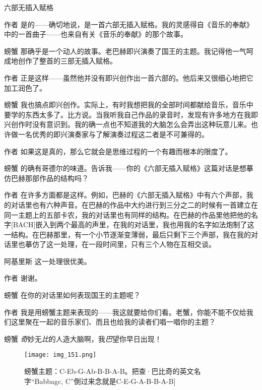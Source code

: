 \begin{dialog}{六部无插入赋格}
\begin{dialogue}
\item[作者]是的——确切地说，是一首六部无插入赋格。我的灵感得自《音乐的奉献》中的一首曲子——也来自有关《音乐的奉献》的那个故事。

\item[螃蟹]那确乎是一个动人的故事。老巴赫即兴演奏了国王的主题。我记得他一气呵成地创作了整首的三部无插入赋格。

\item[作者]正是这样——虽然他并没有即兴创作出一首六部的。他后来又很细心地把它加工润色了。

\item[螃蟹]我也搞点即兴创作。实际上，有时我想把我的全部时间都献给音乐，音乐中要学的东西太多了。比方说。当我听我自己作品的录音时，发现有许多地方在我即兴创作时没有意识到。我的确一点也不知道我的大脑怎么会弄出这种玩意儿来。也许做一名优秀的即兴演奏家与了解演奏过程这二者是不可兼得的。

\item[作者]如果这是真的，那么它就会是思维过程的一个有趣而根本的限度了。

\item[螃蟹]的确有哥德尔的味道。告诉我——你的《六部无插入赋格》这篇对话是想摹仿巴赫那部作品的结构吗？

\item[作者]在许多方面都是这样。例如，巴赫的《六部无插入赋格》中有六个声部，我的对话里也有六种声音。在巴赫的作品中大约进行到三分之二的时候有一首建立在同一主题上的五部卡农，我的对话里也有同样的结构。在巴赫的作品里他把他的名字[BACH]嵌入到两个最高的声里，在我的对话里，我也用我的名字如法炮制了这一结构。在巴赫那里，有一个小节逐渐变薄弱，最后只剩下三个声部，我在我的对话里也摹仿了这一处理，在一段时间里，只有三个人物在互相交谈。

\item[阿基里斯]这一处理很优美。

\item[作者]谢谢。

\item[螃蟹]在你的对话里如何表现国王的主题呢？

\item[作者]我是用螃蟹主题来表现的——我这就要给你们看。老蟹，你能不能不仅给我们这里聚在一起的音乐家们、而且也给我的读者们唱一唱你的主题？

\item[螃蟹]\emph{奇}妙无\emph{比}的人造大脑啊，我\emph{巴}望你早日出现！

\begin{figure}
\texttt{[image: img\_151.png]}
\caption[螃蟹主题。]
  {螃蟹主题：C-Eb-G-Ab-B-B-A-B。把查·巴比奇的英文名字“Babbagc, C”倒过来念就是C-E-G-A-B-B-A-B] }
\end{figure}


\end{dialogue}
\end{dialog}
